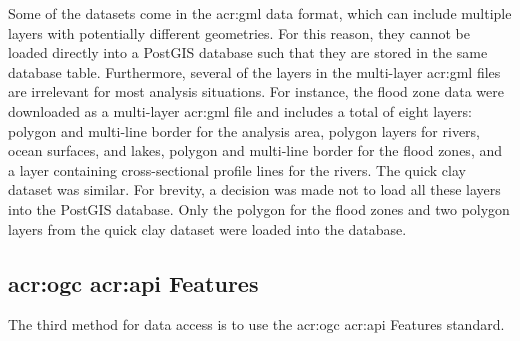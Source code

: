 Some of the datasets come in the \acrshort{acr:gml} data format, which can include multiple layers with potentially different geometries. For this reason, they cannot be loaded directly into a PostGIS database such that they are stored in the same database table. Furthermore, several of the layers in the multi-layer \acrshort{acr:gml} files are irrelevant for most analysis situations. For instance, the flood zone data were downloaded as a multi-layer \acrshort{acr:gml} file and includes a total of eight layers: polygon and multi-line border for the analysis area, polygon layers for rivers, ocean surfaces, and lakes, polygon and multi-line border for the flood zones, and a layer containing cross-sectional profile lines for the rivers. The quick clay dataset was similar. For brevity, a decision was made not to load all these layers into the PostGIS database. Only the polygon for the flood zones and two polygon layers from the quick clay dataset were loaded into the database.

\subsection[OGC API Features]{\acrshort{acr:ogc} \acrshort{acr:api} Features}
\label{subsec:ogc-api-features-data}

The third method for data access is to use the \acrshort{acr:ogc} \acrshort{acr:api} Features standard.

\glsresetall
